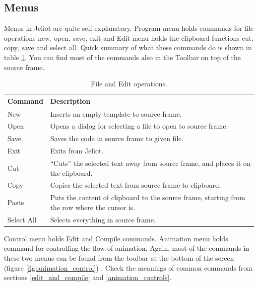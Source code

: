 \documentclass[a4paper,11pt,english]{article}
\newcommand{\jel}{Jeliot}
\newcommand{\bu}[1]{\textsf{#1}}
\newcommand{\menu}{\bu}
\begin{document}
{\subsection{\label{menus}Menus}



Menus in Jeliot are quite self-explanatory. \menu{Program} menu holds commands for file operations \menu{new}, \menu{open}, \menu{save}, \menu{exit} and \menu{Edit} menu holds the clipboard functions \menu{cut}, \menu{copy}, \menu{save} and \menu{select all}. Quick summary of what these commands do is shown in table \ref{tbl:fileandedit}. You can find most of the commands also in the Toolbar on top of the source frame.

\begin{table}[ht]
\begin{center}
\caption{\label{tbl:fileandedit}File and Edit operations.}
\begin{tabular}{l|p{100mm}}
\hline
\textbf{Command} & \textbf{Description} \\
\hline
\menu{New} & Inserts an empty template to source frame. \\
\menu{Open} & Opens a dialog for selecting a file to open to source frame. \\
\menu{Save} & Saves the code in source frame to given file. \\
\menu{Exit} & Exits from \jel{}. \\
\menu{Cut} & ``Cuts'' the selected text away from source frame, and places it on the clipboard. \\
\menu{Copy} & Copies the selected text from source frame to clipboard. \\
\menu{Paste} & Puts the content of clipboard to the source frame, starting from the row where the cursor is. \\
\menu{Select All} & Selects everything in source frame. \\
\hline
\end{tabular}
\end{center}
\end{table}

\menu{Control} menu holds \menu{Edit} and \menu{Compile} commands. \menu{Animation} menu holds command for controlling the flow of animation. Again, most of the commands in these two menus can be found from the toolbar at the bottom of the screen (figure \ref{fig:animation_control}) . Check the meanings of common commands from sections \ref{edit_and_compile} and \ref{animation_controls}.

}
\end{document}
